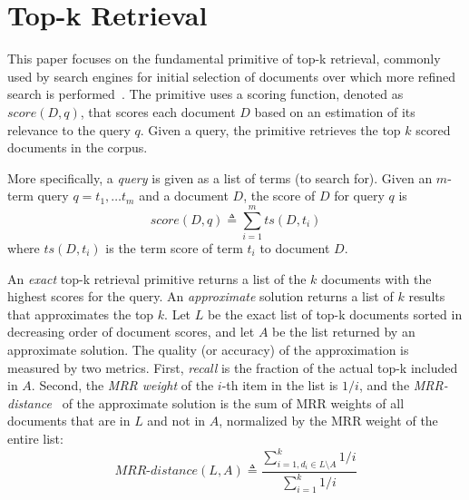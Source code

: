 

\section{Top-k Retrieval}
\label{sec:problem}

This paper focuses on the fundamental primitive of top-k retrieval, commonly used by search engines for initial selection of documents over which more refined search is performed~\cite{Wang:2011}. The primitive uses a scoring function, denoted as $\textit{score}(D, q)$, that scores each document
$D$ based on an estimation of its relevance to the query $q$.
Given a query, the primitive retrieves the top $k$ scored documents in the corpus. 

More specifically, a \emph{query} is given as a list of terms (to search for). Given an $m$-term query $q = t_1, \dots t_m$ and a document $D$, the score of $D$ for query $q$ is 
\begin{equation} \label{eq:score}
\textit{score}(D, q) \triangleq \sum_{i=1}^m ts(D, t_i) 
\nonumber
\end{equation}
where $ts(D, t_i)$ is the term score of term $t_i$ to document $D$. 

An \emph{exact} top-k retrieval primitive returns a list of the $k$ documents with the highest scores for the query.
An \emph{approximate} solution returns a list of $k$ results that approximates the top $k$. 
Let $L$ be the exact list of top-k documents sorted in decreasing order of document scores,  
and let $A$ be the list returned by an approximate solution. 
The quality (or accuracy) of the approximation is measured by two metrics. 
First, \emph{recall} is  the fraction of the actual top-k included in $A$.
Second, the \emph{MRR weight} of the $i$-th item in the list is $1/i$, and the \emph{MRR-distance}~\cite{Broder:2003} of the approximate solution is the sum of MRR weights of all documents that are in $L$ and not in $A$, normalized by the MRR weight of the entire list:
\begin{equation} \label{eq:mrr}
\textit{MRR-distance}(L,A) \triangleq \dfrac{\sum_{i=1,d_i \in L \setminus A}^k 1/i}{\sum_{i=1}^k 1/i}
\nonumber
\end{equation}


